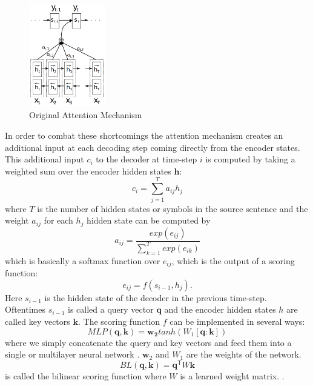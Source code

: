 \documentclass[12pt]{article}
\begin{document}
\begin{figure}[H]
	\label{fig:attentiona}
	\centering
	\includegraphics[width=0.3\textwidth]{pics/bahdanau_attn.png}
	\caption{Original Attention Mechanism \cite{Bahdanau:2014}}
\end{figure}
In order to combat these shortcomings the attention mechanism creates an additional input at each decoding step coming directly from the encoder states. This additional input \(c_i\) to the decoder at time-step \(i\) is computed by taking a weighted sum over the encoder hidden states \(\bm{h}\):
\begin{equation} \label{eqattention}
c_i=\sum_{j=1}^{T}a_{ij}h_j
\end{equation}
where \(T\) is the number of hidden states or symbols in the source sentence and the weight \(a_{ij}\) for each \(h_j\) hidden state can be computed by
\begin{equation}
a_{ij}=\frac{exp(e_{ij})}{\sum_{k=1}^{T}exp(e_{ik})}
\end{equation}
which is basically a softmax function over \(e_{ij}\), which is the output of a scoring function:
\begin{equation}
e_{ij}=f(s_{i-1},h_j).
\end{equation}
Here \(s_{i-1}\) is the hidden state of the decoder in the previous time-step. Oftentimes \(s_{i-1}\) is called a query vector \(\bm{q}\) and the encoder hidden states \(h\) are called key vectors \(\bm{k}\).
The scoring function \(f\) can be implemented in several ways:
\begin{equation}
MLP(\bm{q},\bm{k})=\bm{w_2}tanh(W_1[\bm{q}:\bm{k}])
\end{equation}
where we simply concatenate the query and key vectors and feed them into a single or multilayer neural network \cite{Bahdanau:2014}. \(\bm{w}_2\) and \(W_1\) are the weights of the network.
\begin{equation}
BL(\bm{q},\bm{k})=\bm{q}^\mathsf{T}W\bm{k}
\end{equation}
is called the bilinear scoring function where \(W\) is a learned weight matrix. \cite{Luong:2015}.
\end{document}
